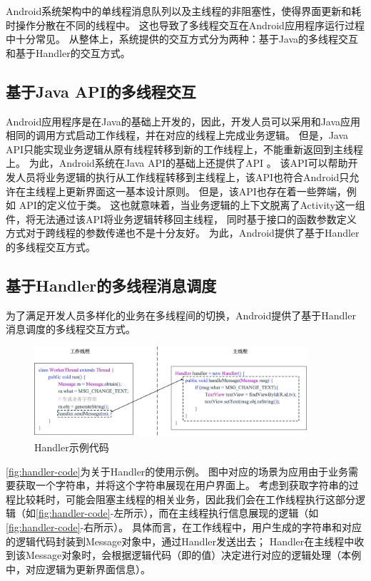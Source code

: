 Android系统架构中的单线程消息队列以及主线程的非阻塞性，使得界面更新和耗时操作分散在不同的线程中。
这也导致了多线程交互在Android应用程序运行过程中十分常见。
从整体上，系统提供的交互方式分为两种：基于Java的多线程交互和基于Handler的交互方式。%

\subsection{基于Java API的多线程交互}

Android应用程序是在Java的基础上开发的，因此，开发人员可以采用和Java应用相同的调用方式启动工作线程，并在对应的线程上完成业务逻辑。
但是，Java API只能实现业务逻辑从原有线程转移到新的工作线程上，不能重新返回到主线程上。
为此，Android系统在Java API的基础上还提供了API 。
该API可以帮助开发人员将业务逻辑的执行从工作线程转移到主线程上，该API也符合Android只允许在主线程上更新界面这一基本设计原则。
但是，该API也存在着一些弊端，例如 API的定义位于类。
这也就意味着，当业务逻辑的上下文脱离了Activity这一组件，将无法通过该API将业务逻辑转移回主线程，
同时基于接口的函数参数定义方式对于跨线程的参数传递也不是十分友好。
为此，Android提供了基于Handler的多线程交互方式。

\subsection{基于Handler的多线程消息调度}

为了满足开发人员多样化的业务在多线程间的切换，Android提供了基于Handler消息调度的多线程交互方式。



\begin{figure}[h]
	\centering
	\includegraphics[width=0.9\textwidth]{./Figures/handler-code.png}
	\caption{Handler示例代码}
	\label{fig:handler-code}
\end{figure}


\autoref{fig:handler-code}为关于Handler的使用示例。
图中对应的场景为应用由于业务需要获取一个字符串，并将这个字符串展现在用户界面上。
考虑到获取字符串的过程比较耗时，可能会阻塞主线程的相关业务，因此我们会在工作线程执行这部分逻辑（如\autoref{fig:handler-code}-左所示），而在主线程执行信息展现的逻辑（如\autoref{fig:handler-code}-右所示）。
具体而言，在工作线程中，用户生成的字符串和对应的逻辑代码封装到{Message}对象中，通过Handler发送出去；
Handler在主线程中收到该{Message}对象时，会根据逻辑代码（即的值）决定进行对应的逻辑处理（本例中，对应逻辑为更新界面信息）。


